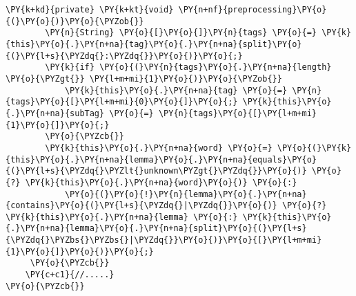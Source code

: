 \begin{Verbatim}[frame=single,commandchars=\\\{\}]
    \PY{k+kd}{private} \PY{k+kt}{void} \PY{n+nf}{preprocessing}\PY{o}{(}\PY{o}{)}\PY{o}{\PYZob{}}
        \PY{n}{String} \PY{o}{[}\PY{o}{]}\PY{n}{tags} \PY{o}{=} \PY{k}{this}\PY{o}{.}\PY{n+na}{tag}\PY{o}{.}\PY{n+na}{split}\PY{o}{(}\PY{l+s}{\PYZdq{}:\PYZdq{}}\PY{o}{)}\PY{o}{;}
        \PY{k}{if} \PY{o}{(}\PY{n}{tags}\PY{o}{.}\PY{n+na}{length} \PY{o}{\PYZgt{}} \PY{l+m+mi}{1}\PY{o}{)}\PY{o}{\PYZob{}}
            \PY{k}{this}\PY{o}{.}\PY{n+na}{tag} \PY{o}{=} \PY{n}{tags}\PY{o}{[}\PY{l+m+mi}{0}\PY{o}{]}\PY{o}{;} \PY{k}{this}\PY{o}{.}\PY{n+na}{subTag} \PY{o}{=} \PY{n}{tags}\PY{o}{[}\PY{l+m+mi}{1}\PY{o}{]}\PY{o}{;}
        \PY{o}{\PYZcb{}}
        \PY{k}{this}\PY{o}{.}\PY{n+na}{word} \PY{o}{=} \PY{o}{(}\PY{k}{this}\PY{o}{.}\PY{n+na}{lemma}\PY{o}{.}\PY{n+na}{equals}\PY{o}{(}\PY{l+s}{\PYZdq{}\PYZlt{}unknown\PYZgt{}\PYZdq{}}\PY{o}{)} \PY{o}{?} \PY{k}{this}\PY{o}{.}\PY{n+na}{word}\PY{o}{)} \PY{o}{:} 
            \PY{o}{(}\PY{o}{!}\PY{n}{lemma}\PY{o}{.}\PY{n+na}{contains}\PY{o}{(}\PY{l+s}{\PYZdq{}|\PYZdq{}}\PY{o}{)} \PY{o}{?} \PY{k}{this}\PY{o}{.}\PY{n+na}{lemma} \PY{o}{:} \PY{k}{this}\PY{o}{.}\PY{n+na}{lemma}\PY{o}{.}\PY{n+na}{split}\PY{o}{(}\PY{l+s}{\PYZdq{}\PYZbs{}\PYZbs{}|\PYZdq{}}\PY{o}{)}\PY{o}{[}\PY{l+m+mi}{1}\PY{o}{]}\PY{o}{)}\PY{o}{;}
     \PY{o}{\PYZcb{}}  
    \PY{c+c1}{//.....}
\PY{o}{\PYZcb{}}
\end{Verbatim}

